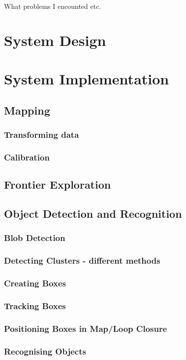 \documentclass{mproj}
\begin{document}
What problems I encounted etc.

\chapter{System Design}

\chapter{System Implementation}
\section{Mapping}
\subsection{Transforming data}
\subsection{Calibration}
\section{Frontier Exploration}
\section{Object Detection and Recognition}
\subsection{Blob Detection}
\subsection{Detecting Clusters - different methods}
\subsection{Creating Boxes}
\subsection{Tracking Boxes}
\subsection{Positioning Boxes in Map/Loop Closure}
\subsection{Recognising Objects}
\end{document}
